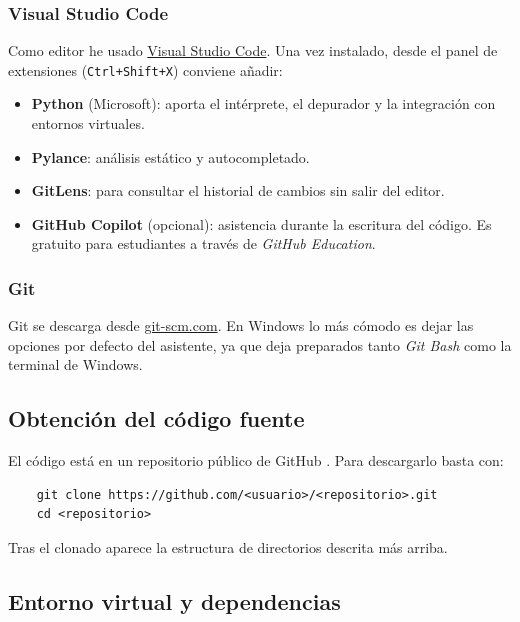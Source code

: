 \subsubsection{Visual Studio Code}

Como editor he usado \href{https://code.visualstudio.com/}{Visual Studio Code}. Una vez instalado, desde el panel de extensiones (\texttt{Ctrl+Shift+X}) conviene añadir:

\begin{itemize}
	\item \textbf{Python} (Microsoft): aporta el intérprete, el depurador y la integración con entornos virtuales.
	\item \textbf{Pylance}: análisis estático y autocompletado.
	\item \textbf{GitLens}: para consultar el historial de cambios sin salir del editor.
	\item \textbf{GitHub Copilot} (opcional): asistencia durante la escritura del código. Es gratuito para estudiantes a través de \textit{GitHub Education}.
\end{itemize}

\subsubsection{Git}

Git se descarga desde \href{https://git-scm.com/}{git-scm.com}. En Windows lo más cómodo es dejar las opciones por defecto del asistente, ya que deja preparados tanto \textit{Git Bash} como la terminal de Windows.

\subsection{Obtención del código fuente}

El código está en un repositorio público de GitHub \cite{github_official}. Para descargarlo basta con:

\begin{verbatim}
	git clone https://github.com/<usuario>/<repositorio>.git
	cd <repositorio>
\end{verbatim}

Tras el clonado aparece la estructura de directorios descrita más arriba.

\subsection{Entorno virtual y dependencias}

